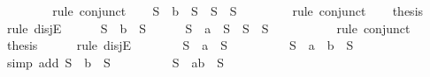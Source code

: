 \begin{isabellebody}
\ \ \ \ \isamarkupfalse%
\ {}\ \isamarkupfalse%
\ {\isacharparenleft}rule\ conjunct{}{\isacharparenright}\isanewline
\ \ \isamarkupfalse%
\ {\isachardoublequoteopen}S{}\ {\isacharequal}\ {\isacharbraceleft}b{\isacharbraceright}\ {\isasymunion}\ S{}\ {\isasymor}\ S{}\ {\isacharequal}\ S{}{\isachardoublequoteclose}\isanewline
\ \ \ \ \isamarkupfalse%
\ {}\ \isamarkupfalse%
\ {\isacharparenleft}rule\ conjunct{}{\isacharparenright}\isanewline
\ \ \isamarkupfalse%
\ {\isacharquery}thesis\isanewline
\ \ \isamarkupfalse%
\ {\isacharparenleft}rule\ disjE{\isacharparenright}\isanewline
\ \ \ \ \isamarkupfalse%
\ {\isachardoublequoteopen}S{}\ {\isacharequal}\ {\isacharbraceleft}b{\isacharbraceright}\ {\isasymunion}\ S{}{\isachardoublequoteclose}\isanewline
\ \ \ \ \isamarkupfalse%
\ {\isachardoublequoteopen}S\ {\isacharequal}\ {\isacharbraceleft}a{\isacharbraceright}\ {\isasymunion}\ S{}\ {\isasymor}\ S\ {\isacharequal}\ S{}{\isachardoublequoteclose}\isanewline
\ \ \ \ \ \ \isamarkupfalse%
\ {}\ \isamarkupfalse%
\ {\isacharparenleft}rule\ conjunct{}{\isacharparenright}\isanewline
\ \ \ \ \isamarkupfalse%
\ {\isacharquery}thesis\isanewline
\ \ \ \ \isamarkupfalse%
\ {\isacharparenleft}rule\ disjE{\isacharparenright}\isanewline
\ \ \ \ \ \ \isamarkupfalse%
\ {\isachardoublequoteopen}S\ {\isacharequal}\ {\isacharbraceleft}a{\isacharbraceright}\ {\isasymunion}\ S{}{\isachardoublequoteclose}\isanewline
\ \ \ \ \ \ \isamarkupfalse%
\ \isamarkupfalse%
\ {\isachardoublequoteopen}S\ {\isacharequal}\ {\isacharbraceleft}a{\isacharbraceright}\ {\isasymunion}\ {\isacharbraceleft}b{\isacharbraceright}\ {\isasymunion}\ S{}{\isachardoublequoteclose}\isanewline
\ \ \ \ \ \ \ \ \isamarkupfalse%
\ {\isacharparenleft}simp\ add{\isacharcolon}\ {\isacartoucheopen}S{}\ {\isacharequal}\ {\isacharbraceleft}b{\isacharbraceright}\ {\isasymunion}\ S{}{\isacartoucheclose}{\isacharparenright}\isanewline
\ \ \ \ \ \ \isamarkupfalse%
\ \isamarkupfalse%
\ {\isachardoublequoteopen}S\ {\isacharequal}\ {\isacharbraceleft}a{\isacharcomma}b{\isacharbraceright}\ {\isasymunion}\ S{}{\isachardoublequoteclose}\isanewline

\end{isabellebody}
